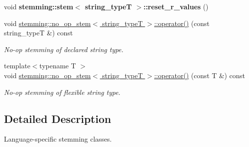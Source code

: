 \begin{DoxyCompactItemize}
\item 
\hypertarget{group___stemming_gacefba08458c6a8cc00a733afb3a064ed}{void {\bfseries stemming\-::stem$<$ string\-\_\-type\-T $>$\-::reset\-\_\-r\-\_\-values} ()}\label{group___stemming_gacefba08458c6a8cc00a733afb3a064ed}

\item 
\hypertarget{group___stemming_ga5e95ea3afb739e7bea6b14a3e9150c89}{void \hyperlink{group___stemming_ga5e95ea3afb739e7bea6b14a3e9150c89}{stemming\-::no\-\_\-op\-\_\-stem$<$ string\-\_\-type\-T $>$\-::operator()} (const string\-\_\-type\-T \&) const }\label{group___stemming_ga5e95ea3afb739e7bea6b14a3e9150c89}

\begin{DoxyCompactList}\small\item\em No-\/op stemming of declared string type. \end{DoxyCompactList}\item 
\hypertarget{group___stemming_ga8109dda5e97b7c138f9aa9ec9ea4ee9f}{{\footnotesize template$<$typename T $>$ }\\void \hyperlink{group___stemming_ga8109dda5e97b7c138f9aa9ec9ea4ee9f}{stemming\-::no\-\_\-op\-\_\-stem$<$ string\-\_\-type\-T $>$\-::operator()} (const T \&) const }\label{group___stemming_ga8109dda5e97b7c138f9aa9ec9ea4ee9f}

\begin{DoxyCompactList}\small\item\em No-\/op stemming of flexible string type. \end{DoxyCompactList}\end{DoxyCompactItemize}


\subsection{Detailed Description}
Language-\/specific stemming classes. 

